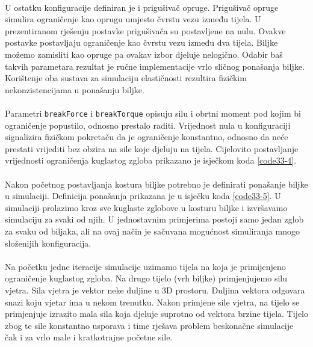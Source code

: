 \documentclass[times, utf8, diplomski]{fer}
\begin{document}
\paragraph{}
U ostatku konfiguracije definiran je i prigušivač opruge. Prigušivač opruge simulira 
ograničenje kao oprugu umjesto čvrstu vezu između tijela. U prezentiranom rješenju postavke
prigušivača su postavljene na nulu. Ovakve postavke postavljaju ograničenje kao čvrstu vezu
između dva tijela. Biljke možemo zamisliti kao opruge pa ovakav izbor djeluje nelogično. 
Odabir baš takvih parametara rezultat je ručne implementacije vrlo sličnog ponašanja biljke.
Korištenje oba sustava za simulaciju elastičnosti rezultira fizičkim nekonzistencijama u 
ponašanju biljke.

\paragraph{}
Parametri \verb#breakForce# i \verb#breakTorque# opisuju silu i obrtni moment pod kojim bi
ograničenje popustilo, odnosno prestalo raditi. Vrijednost nula u konfiguraciji signalizira
fizičkom pokretaču da je ograničenje konstantno, odnosno da neće prestati vrijediti bez 
obzira na sile koje djeluju na tijela. Cijelovito postavljanje vrijednosti ograničenja 
kuglastog zgloba prikazano je isječkom koda \ref{code33-4}.

\paragraph{}
Nakon početnog postavljanja kostura biljke potrebno je definirati ponašanje biljke u 
simulaciji. Definicija ponašanja prikazana je u isječku koda \ref{code33-5}. U simulaciji
prolazimo kroz sve kuglaste zglobove u kosturu biljke i izvršavamo simulaciju za svaki od 
njih. U jednostavnim primjerima postoji samo jedan zglob za svaku od biljaka, ali na ovaj 
način je sačuvana mogućnost simuliranja mnogo složenijih konfiguracija.

\paragraph{}
Na početku jedne iteracije simulacije uzimamo tijela na koja je primijenjeno ograničenje
kuglastog zgloba. Na drugo tijelo (vrh biljke) primjenjujemo silu vjetra. Sila vjetra 
je vektor neke duljine u 3D prostoru. Duljina vektora odgovara snazi koju vjetar ima u nekom 
trenutku. Nakon primjene sile vjetra, na tijelo se primjenjuje izrazito mala sila koja 
djeluje suprotno od vektora brzine tijela. Tijelo zbog te sile konstantno usporava i 
time rješava problem beskonačne simulacije čak i za vrlo male i kratkotrajne početne sile.
\end{document}

